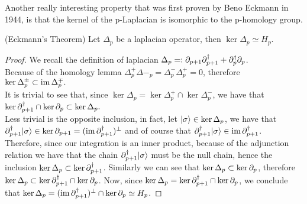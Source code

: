 \documentclass[../1.tex]{subfiles}
\begin{document}
    Another really interesting property that was first proven by Beno Eckmann in 1944, is that the kernel of the p-Laplacian
    is isomorphic to the p-homology group.

    \begin{thm}
        {\normalfont (Eckmann's Theorem)} Let $\Delta_p$ be a laplacian operator, then $\ker\Delta_p \simeq H_p$.
    \end{thm}
    \begin{proof}
        We recall the definition of laplacian $\Delta_p =: \partial_{p+1}\partial^\dagger_{p+1} + \partial^\dagger_p\partial_p$.\\
        Because of the homology lemma $\Delta^+_p\Delta-_p = \Delta^-_p\Delta^+_p = 0$, therefore $\ker\Delta^{\pm}_p \subset \mathrm{im}\,\Delta^{\mp}_p.$\\
        It is trivial to see that, since $\ker\Delta_p = \ker\Delta^+_p \cap \ker\Delta^-_p $, we have that $\ker\partial^\dagger_{p+1} \cap \ker\partial_p \subset \ker\Delta_p.$ \\
        Less trivial is the opposite inclusion, in fact, let $| \sigma \rangle \in \ker\Delta_p$, we have that $\partial_{p+1}^\dagger| \sigma \rangle \in \ker\partial_{p+1} = (\mathrm{im}\,\partial_{p+1}^\dagger)^\perp$ 
        and of course that $\partial_{p+1}^\dagger| \sigma \rangle \in \mathrm{im}\,\partial_{p+1}^\dagger$.\\
        Therefore, since our integration is an inner product, because of the adjunction relation we have that the chain $\partial_{p+1}^\dagger| \sigma \rangle$ must
        be the null chain, hence the inclusion $\ker\Delta_p \subset \ker\partial_{p+1}^\dagger$. Similarly we can see that $\ker\Delta_p \subset \ker\partial_p$,        
        therefore $\ker\Delta_p \subset \ker\partial^\dagger_{p+1} \cap \ker\partial_p $. Now, since $\ker\Delta_p = \ker\partial^\dagger_{p+1} \cap \ker\partial_p$, we conclude that 
        $\ker\Delta_p = (\mathrm{im}\,\partial_{p+1}^\dagger)^\perp \cap \ker\partial_p \simeq H_p$. \qedhere
    \end{proof}
\end{document}
